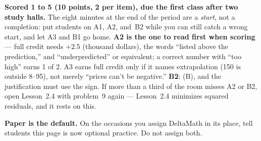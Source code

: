 \documentclass[10pt]{article}
\begin{document}
\begin{teachernote}[Homework]
\textbf{Scored 1 to 5 (10 points, 2 per item), due the first class after two study halls.} The eight
minutes at the end of the period are a \emph{start}, not a completion: put students on A1, A2,
and~B2 while you can still catch a wrong start, and let A3 and B1 go home. \textbf{A2 is the
one to read first when scoring} --- full credit needs $+2.5$ (thousand dollars), the words
``listed above the prediction,'' and ``underpredicted'' or equivalent; a correct number with
``too high'' earns 1 of 2. A3 earns full credit only if it names extrapolation (150 is outside
8--95), not merely ``prices can't be negative.'' \textbf{B2}: (B), and the justification must
use the sign. If more than a third of the room misses A2 or B2, open Lesson~2.4 with problem~9
again --- Lesson~2.4 minimizes squared residuals, and it rests on this.

\textbf{Paper is the default.} On the occasions you assign DeltaMath in its place, tell students this page is now optional practice. Do not assign
both.
\end{teachernote}
\end{document}
